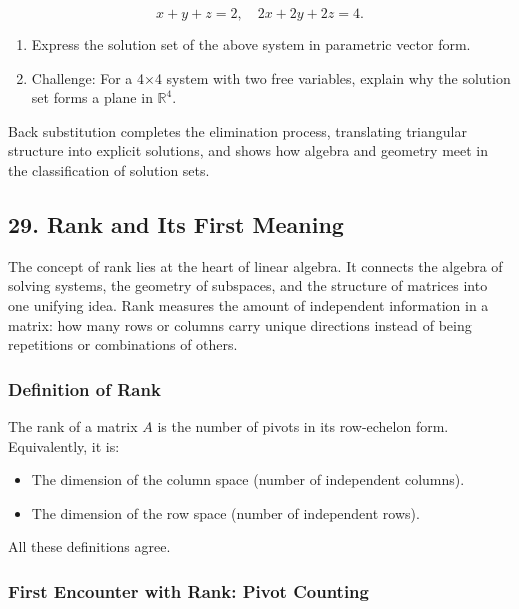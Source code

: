 \documentclass[
  letterpaper,
  DIV=11,
  numbers=noendperiod]{scrreprt}
\providecommand{\tightlist}{%
  \setlength{\itemsep}{0pt}\setlength{\parskip}{0pt}}
\begin{document}
\[
x + y + z = 2, \quad 2x + 2y + 2z = 4.
\]

\begin{enumerate}
\def\labelenumi{\arabic{enumi}.}
\setcounter{enumi}{2}
\item
  Express the solution set of the above system in parametric vector
  form.
\item
  Challenge: For a 4×4 system with two free variables, explain why the
  solution set forms a plane in \(\mathbb{R}^4\).
\end{enumerate}

Back substitution completes the elimination process, translating
triangular structure into explicit solutions, and shows how algebra and
geometry meet in the classification of solution sets.

\subsection{29. Rank and Its First
Meaning}\label{rank-and-its-first-meaning}

The concept of rank lies at the heart of linear algebra. It connects the
algebra of solving systems, the geometry of subspaces, and the structure
of matrices into one unifying idea. Rank measures the amount of
independent information in a matrix: how many rows or columns carry
unique directions instead of being repetitions or combinations of
others.

\subsubsection{Definition of Rank}\label{definition-of-rank}

The rank of a matrix \(A\) is the number of pivots in its row-echelon
form. Equivalently, it is:

\begin{itemize}
\tightlist
\item
  The dimension of the column space (number of independent columns).
\item
  The dimension of the row space (number of independent rows).
\end{itemize}

All these definitions agree.

\subsubsection{First Encounter with Rank: Pivot
Counting}\label{first-encounter-with-rank-pivot-counting}
\end{document}
